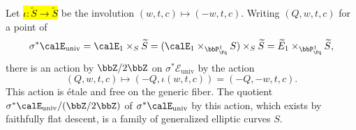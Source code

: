 \begin{context}
    Let \hl{$\iota: \widetilde{S} \to \widetilde{S}$} be the involution $(w,t,c) \mapsto (-w,t,c)$. Writing $(Q, w, t, c)$ for a point of 
    $$\sigma^* \calE_{\text{univ}} = \calE_1 \times_S \widetilde{S} = (\calE_1 \times_{\bbP_\Fq^1} S) \times_S \widetilde{S} = \widetilde{E}_1\times_{\bbP_{\Fq}^1} \widetilde{S},$$
    there is an action by $\bbZ/2\bbZ$ on $\sigma^* \mathcal{E}_{\text{univ}}$ by the action
    $$(Q, w, t, c) \mapsto (-Q, \iota(w,t,c)) = (-Q, -w, t, c).$$
    This action is \'etale and free on the generic fiber. The quotient $\sigma^* \calE_{\text{univ}} / (\bbZ/2\bbZ)$ of $\sigma^* \calE_{\text{univ}}$ by this action, which exists by faithfully flat descent, is a family of generalized elliptic curves $S$. 
\end{context}

